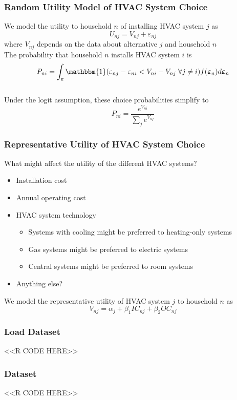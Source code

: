 \documentclass{beamer}
\begin{document}
\begin{frame}\frametitle{Random Utility Model of HVAC System Choice}
    We model the utility to household $n$ of installing HVAC system $j$ as
    $$U_{nj} = V_{nj} + \varepsilon_{nj}$$
    where $V_{nj}$ depends on the data about alternative $j$ and household $n$ \\
    \vspace{3ex}
    The probability that household $n$ installs HVAC system $i$ is
 	$$P_{ni} = \int_{\bm{\varepsilon}} \mathbbm{1}(\varepsilon_{nj} - \varepsilon_{ni} < V_{ni} - V_{nj} \; \forall j \neq i) f(\bm{\varepsilon}_n) d\bm{\varepsilon}_n$$ \\
 	\vspace{2ex}
  	Under the logit assumption, these choice probabilities simplify to
    $$P_{ni} = \frac{e^{V_{ni}}}{\sum_j e^{V_{nj}}}$$
\end{frame}

\begin{frame}\frametitle{Representative Utility of HVAC System Choice}
	What might affect the utility of the different HVAC systems?
	\begin{itemize}
		\item Installation cost
		\item Annual operating cost
		\item HVAC system technology
		\begin{itemize}
			\item Systems with cooling might be preferred to heating-only systems
			\item Gas systems might be preferred to electric systems
			\item Central systems might be preferred to room systems
		\end{itemize}
		\item Anything else?
	\end{itemize}
    \vspace{3ex}
    We model the representative utility of HVAC system $j$ to household $n$ as
    $$V_{nj} = \alpha_j + \beta_1 IC_{nj} + \beta_2 OC_{nj}$$
\end{frame}

\begin{frame}[fragile]\frametitle{Load Dataset}
    <<R CODE HERE>>
\end{frame}

\begin{frame}[fragile]\frametitle{Dataset}
    <<R CODE HERE>>
\end{frame}
\end{document}
